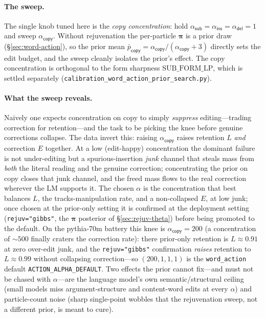 \documentclass[11pt]{article}
\providecommand{\copyact}{\textsf{copy}}
\providecommand{\subact}{\textsf{sub}}
\providecommand{\insact}{\textsf{ins}}
\providecommand{\delact}{\textsf{del}}
\providecommand{\code}[1]{\texttt{#1}}
\providecommand{\actdist}{\bm{\pi}}            %
\begin{document}
\paragraph{The sweep.} The single knob tuned here is the \emph{copy concentration}: hold $\alpha_{\subact}=\alpha_{\insact}=\alpha_{\delact}=1$ and sweep $\alpha_{\copyact}$. Without rejuvenation the per-particle $\actdist$ is a prior draw (\S\ref{sec:word-action}), so the prior mean $\bar p_{\copyact}=\alpha_{\copyact}/(\alpha_{\copyact}+3)$ directly sets the edit budget, and the sweep cleanly isolates the prior's effect. The copy concentration is orthogonal to the form sharpness $\mathrm{SUB\_FORM\_LP}$, which is settled separately (\code{calibration\_word\_action\_prior\_search.py}).

\paragraph{What the sweep reveals.} Naively one expects concentration on copy to simply \emph{suppress} editing---trading correction for retention---and the task to be picking the knee before genuine corrections collapse. The data invert this: raising $\alpha_{\copyact}$ raises retention $L$ \emph{and} correction $E$ together. At a low (edit-happy) concentration the dominant failure is not under-editing but a spurious-insertion \emph{junk} channel that steals mass from \emph{both} the literal reading and the genuine correction; concentrating the prior on copy closes that junk channel, and the freed mass flows to the real correction wherever the LM supports it. The chosen $\alpha$ is the concentration that best balances $L$, the tracks-manipulation rate, and a non-collapsed $E$, at low junk; once chosen at the prior-only setting it is confirmed at the deployment setting (\code{rejuv="gibbs"}, the $\actdist$ posterior of \S\ref{sec:rejuv-theta}) before being promoted to the default. On the pythia-70m battery this knee is $\alpha_{\copyact}=200$ (a concentration of $\sim\!500$ finally craters the correction rate): there prior-only retention is $L\approx0.91$ at zero over-edit junk, and the \code{rejuv="gibbs"} confirmation \emph{raises} retention to $L\approx0.99$ without collapsing correction---so $(200,1,1,1)$ is the \code{word\_action} default \code{ACTION\_ALPHA\_DEFAULT}. Two effects the prior cannot fix---and must not be chased with $\alpha$---are the language model's own semantic/structural ceiling (small models miss argument-structure and content-word edits at every $\alpha$) and particle-count noise (sharp single-point wobbles that the rejuvenation sweep, not a different prior, is meant to cure).
\end{document}
